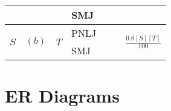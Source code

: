 \documentclass{article}
\newcommand{\sol}[1]{\iftoggle{showsolutions}{\textcolor{red}{#1}}{\phantom{#1}}}
\begin{document}
\begin{center}
\begin{tabular}{|l|l|l|l|l|l|l|}
                         &                        &                      & SMJ  & \sol{$(b)$}    & \sol{$SC(0.5[R]) + 0.5[R][S]$} & \\\hline
    \multirow{2}{*}{$S$} & \multirow{2}{*}{$(b)$} & \multirow{2}{*}{$T$} & PNLJ & \sol{None}     & \sol{$\bnlj{[S]}{0.6[T]}$}     & \multirow{2}{*}{$\frac{0.6[S][T]}{100}$} \\\cline{4-6}
                         &                        &                      & SMJ  & \sol{$(c, b)$} & \sol{$\smj{[S]}{0.6[T]}$}      & \\\hline
  \end{tabular}
\end{center}

\section{ER Diagrams}
\end{document}

